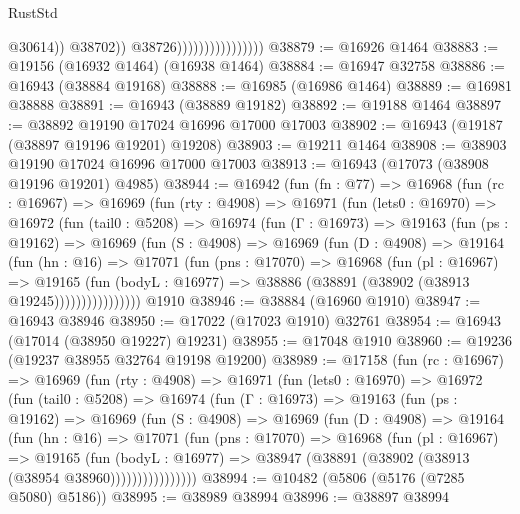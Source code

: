 \begin{lexlean}{RustStd}
\begin{coremodule}
                                            @30614))
                                        @38702))
                                    @38726))))))))))))))))
@38879 := @16926 @1464
@38883 := @19156 (@16932 @1464) (@16938 @1464)
@38884 := @16947 @32758
@38886 := @16943 (@38884 @19168)
@38888 := @16985 (@16986 @1464)
@38889 := @16981 @38888
@38891 := @16943 (@38889 @19182)
@38892 := @19188 @1464
@38897 := @38892 @19190 @17024 @16996 @17000 @17003
@38902 := @16943 (@19187 (@38897 @19196 @19201) @19208)
@38903 := @19211 @1464
@38908 := @38903 @19190 @17024 @16996 @17000 @17003
@38913 := @16943 (@17073 (@38908 @19196 @19201) @4985)
@38944 := @16942
    (fun (fn : @77) =>
    @16968
      (fun (rc : @16967) =>
      @16969
        (fun (rty : @4908) =>
        @16971
          (fun (lets0 : @16970) =>
          @16972
            (fun (tail0 : @5208) =>
            @16974
              (fun (Γ : @16973) =>
              @19163
                (fun (ps : @19162) =>
                @16969
                  (fun (S : @4908) =>
                  @16969
                    (fun (D : @4908) =>
                    @19164
                      (fun (hn : @16) =>
                      @17071
                        (fun (pns : @17070) =>
                        @16968
                          (fun (pl : @16967) =>
                          @19165
                            (fun (bodyL : @16977) =>
                            @38886 (@38891 (@38902 (@38913 @19245))))))))))))))))
    @1910
@38946 := @38884 (@16960 @1910)
@38947 := @16943 @38946
@38950 := @17022 (@17023 @1910) @32761
@38954 := @16943 (@17014 (@38950 @19227) @19231)
@38955 := @17048 @1910
@38960 := @19236 (@19237 @38955 @32764 @19198 @19200)
@38989 := @17158
    (fun (rc : @16967) =>
    @16969
      (fun (rty : @4908) =>
      @16971
        (fun (lets0 : @16970) =>
        @16972
          (fun (tail0 : @5208) =>
          @16974
            (fun (Γ : @16973) =>
            @19163
              (fun (ps : @19162) =>
              @16969
                (fun (S : @4908) =>
                @16969
                  (fun (D : @4908) =>
                  @19164
                    (fun (hn : @16) =>
                    @17071
                      (fun (pns : @17070) =>
                      @16968
                        (fun (pl : @16967) =>
                        @19165
                          (fun (bodyL : @16977) =>
                          @38947 (@38891 (@38902 (@38913 (@38954 @38960))))))))))))))))
@38994 := @10482 (@5806 (@5176 (@7285 @5080) @5186))
@38995 := @38989 @38994
@38996 := @38897 @38994

\end{coremodule}
\end{lexlean}
